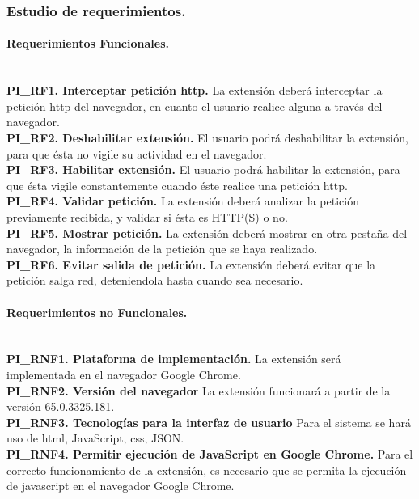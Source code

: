 \documentclass[12pt, a4paper, titlepage]{article}
\begin{document}
			\subsubsection{Estudio de requerimientos.}
				\paragraph{Requerimientos Funcionales.\\ \\}
				{\setlength{\parindent}{12pt}
				\textbf{PI\_RF1. Interceptar petición \acrshort{http}.} La extensión deberá interceptar la petición \acrshort{http} del navegador, en cuanto el usuario realice alguna a través del navegador.\\

				\textbf{PI\_RF2. Deshabilitar extensión.} El usuario podrá deshabilitar la extensión, para que ésta no vigile su actividad en el navegador.\\
				
				\textbf{PI\_RF3. Habilitar extensión.} El usuario podrá habilitar la extensión, para que ésta vigile constantemente cuando éste realice una petición \acrshort{http}.\\
				
				\textbf{PI\_RF4. Validar petición.} La extensión deberá analizar la petición previamente recibida, y validar si ésta es HTTP(S) o no.\\
		        
				\textbf{PI\_RF5. Mostrar petición.} La extensión deberá mostrar en otra pestaña del navegador, la información de la petición que se haya realizado.\\
				
				\textbf{PI\_RF6. Evitar salida de petición.} La extensión deberá evitar que la petición salga red, deteniendola hasta cuando sea necesario. 
		        }
				
				\paragraph{Requerimientos no Funcionales.\\ \\}
				{\setlength{\parindent}{12pt}
				
				\textbf{PI\_RNF1. Plataforma de implementación.} La extensión será implementada en el navegador Google Chrome.\\
				
				\textbf{PI\_RNF2. Versión del navegador} La extensión funcionará a partir de la versión 65.0.3325.181.\\
				
				\textbf{PI\_RNF3. Tecnologías para la interfaz de usuario} Para el sistema se hará uso de \acrshort{html}, JavaScript, \acrshort{css}, JSON.\\
				
				\textbf{PI\_RNF4. Permitir ejecución de JavaScript en Google Chrome.} Para el correcto funcionamiento de la extensión, es necesario que se permita la ejecución de javascript en el navegador Google Chrome.
				}
			
\end{document}
